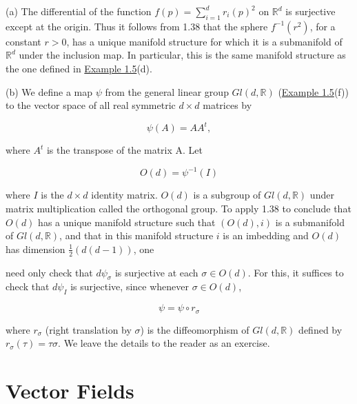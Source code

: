 \begin{examples}\label{thm:1.40}
	(a) The differential of the function $f(p) = \sum_{i=1}^{d} r_i(p)^2$ on $\mathbb{R}^d$ is surjective except at the origin. Thus it follows from 1.38 that the sphere $f^{-1}(r^2)$, for a constant $r > 0$, has a unique manifold structure for which it is a submanifold of $\mathbb{R}^d$ under the inclusion map. In particular, this is the same manifold structure as the one defined in \hyperref[thm:1.5]{Example 1.5}(d).

	(b) We define a map $\psi$ from the general linear group $Gl(d, \mathbb{R})$ (\hyperref[thm:1.5]{Example 1.5}(f)) to the vector space of all real symmetric $d \times d$ matrices by

	\[
		\psi(A)=A A^{t},
	\]

	where  $ A^{t} $ is the transpose of the matrix A. Let

	\[
		O(d)=\psi^{-1}(I)
	\]

	where $I$ is the $d \times d$ identity matrix. $O(d)$ is a subgroup of $Gl(d,\mathbb{R})$ under matrix multiplication called the orthogonal group. To apply 1.38 to conclude that $O(d)$ has a unique manifold structure such that $(O(d),i)$ is a submanifold of $Gl(d,\mathbb{R})$, and that in this manifold structure $i$ is an imbedding and $O(d)$ has dimension $\frac{1}{2}(d(d-1))$, one 

	need only check that  $ d\psi_\sigma $ is surjective at each  $ \sigma \in O(d) $. For this, it suffices to check that  $ d\psi_I $ is surjective, since whenever  $ \sigma \in O(d) $,

	\[
		\psi=\psi\circ r_{\sigma}
	\]

	where  $ r_{\sigma} $ (right translation by  $ \sigma $) is the diffeomorphism of  $ Gl(d, \mathbb{R}) $ defined by  $ r_{\sigma}(\tau) = \tau\sigma $. We leave the details to the reader as an exercise.

\end{examples}

\section{Vector Fields}


